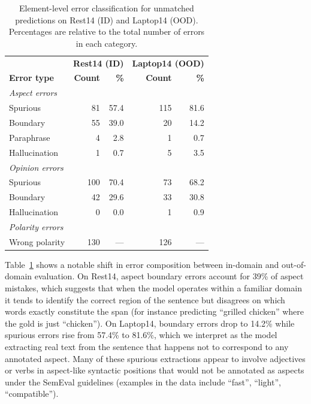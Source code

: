 \documentclass[12pt,a4paper]{report}
\begin{document}
\begin{table}[H]
\centering
\caption{Element-level error classification for unmatched predictions on Rest14 (ID) and Laptop14 (OOD). Percentages are relative to the total number of errors in each category.}
\label{tab:errors-element}
\small
\begin{tabular}{@{}lrrrr@{}}
\toprule
& \multicolumn{2}{c}{\textbf{Rest14 (ID)}} & \multicolumn{2}{c}{\textbf{Laptop14 (OOD)}} \\
\textbf{Error type} & \textbf{Count} & \textbf{\%} & \textbf{Count} & \textbf{\%} \\
\midrule
\multicolumn{5}{l}{\textit{Aspect errors}} \\
\midrule
Spurious & 81 & 57.4 & 115 & 81.6 \\
Boundary & 55 & 39.0 & 20 & 14.2 \\
Paraphrase & 4 & 2.8 & 1 & 0.7 \\
Hallucination & 1 & 0.7 & 5 & 3.5 \\
\midrule
\multicolumn{5}{l}{\textit{Opinion errors}} \\
\midrule
Spurious & 100 & 70.4 & 73 & 68.2 \\
Boundary & 42 & 29.6 & 33 & 30.8 \\
Hallucination & 0 & 0.0 & 1 & 0.9 \\
\midrule
\multicolumn{5}{l}{\textit{Polarity errors}} \\
\midrule
Wrong polarity & 130 & --- & 126 & --- \\
\bottomrule
\end{tabular}
\end{table}

Table~\ref{tab:errors-element} shows a notable shift in error composition between in-domain and out-of-domain evaluation. On Rest14, aspect boundary errors account for 39\% of aspect mistakes, which suggests that when the model operates within a familiar domain it tends to identify the correct region of the sentence but disagrees on which words exactly constitute the span (for instance predicting ``grilled chicken'' where the gold is just ``chicken''). On Laptop14, boundary errors drop to 14.2\% while spurious errors rise from 57.4\% to 81.6\%, which we interpret as the model extracting real text from the sentence that happens not to correspond to any annotated aspect. Many of these spurious extractions appear to involve adjectives or verbs in aspect-like syntactic positions that would not be annotated as aspects under the SemEval guidelines (examples in the data include ``fast'', ``light'', ``compatible'').
\end{document}
